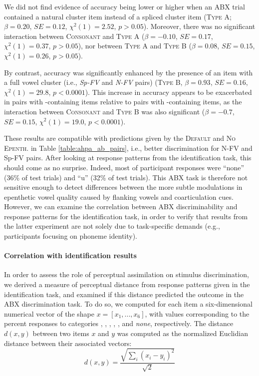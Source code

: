 {We did not find evidence of accuracy being lower or higher when an ABX trial contained a natural cluster item instead of a spliced cluster item (\textsc{Type A}; $\beta = 0.20$, $SE = 0.12$, $\chi^2(1) = 2.52$, $p > 0.05$). Moreover, there was no significant interaction between \textsc{Consonant} and \textsc{Type A} ($\beta = -0.10$, $SE = 0.17$, $\chi^2(1) = 0.37$, $p > 0.05$), nor between \textsc{Type A} and \textsc{Type B} ($\beta = 0.08$, $SE = 0.15$, $\chi^2(1) = 0.26$, $p > 0.05$).

By contrast, accuracy was significantly enhanced by the presence of an item with a full vowel cluster (i.e., \textit{Sp-FV} and \textit{N-FV} pairs) (\textsc{Type B}, $\beta = 0.93$, $SE = 0.16$, $\chi^2(1) = 29.8$, $p < 0.0001$). This increase in accuracy appears to be exacerbated in pairs with -containing items relative to pairs with -containing items, as the interaction between \textsc{Consonant} and \textsc{Type B} was also significant ($\beta = -0.7$, $SE = 0.15$, $\chi^2(1) = 19.0$, $p < 0.0001$).

These results are compatible with predictions given by the \textsc{Default} and \textsc{No Epenth.} in Table \ref{table:ahpa_ab_pairs}, i.e., better discrimination for N-FV and Sp-FV pairs. After looking at response patterns from the identification task, this should come as no surprise. Indeed, most of participant responses were ``none'' (36\% of test trials) and ``u'' (32\% of test trials). This ABX task is therefore not sensitive enough to detect differences between the more subtle modulations in epenthetic vowel quality caused by flanking vowels and coarticulation cues. However, we can examine the correlation between ABX discriminability and response patterns for the identification task, in order to verify that results from the latter experiment are not solely due to task-specific demands (e.g., participants focusing on phoneme identity).    

\paragraph{Correlation with identification results}

In order to assess the role of perceptual assimilation on stimulus discrimination, we derived a measure of perceptual distance from response patterns given in the identification task, and examined if this distance predicted the outcome in the ABX discrimination task. To do so, we computed for each item a six-dimensional numerical vector of the shape $x = [x_{1}, ..., x_{6}]$, with values corresponding to the percent responses to categories , , , , , and \textit{none}, respectively. The distance $d(x,y)$ between two items $x$ and $y$ was computed as the normalized Euclidian distance between their associated vectors:
    \[d(x,y)=\frac{\sqrt{\sum_i (x_{i} - y_{i})^{2}}} {\sqrt{2}}\]

}
